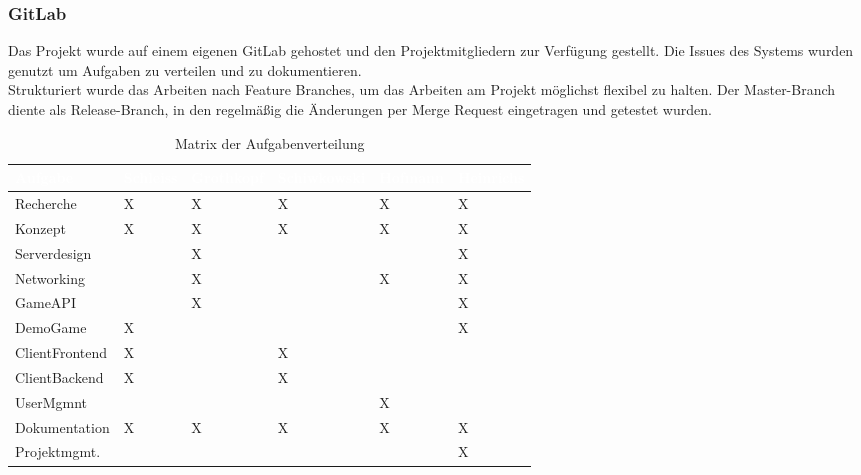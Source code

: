 \documentclass[a4paper]{spie}  %
\begin{document}
\subsubsection{GitLab}
Das Projekt wurde auf einem eigenen GitLab gehostet und den Projektmitgliedern zur Verfügung gestellt. Die Issues des Systems wurden genutzt um Aufgaben zu verteilen und zu dokumentieren.
\\
Strukturiert wurde das Arbeiten nach Feature Branches, um das Arbeiten am Projekt möglichst flexibel zu halten. Der Master-Branch diente als Release-Branch, in den regelmäßig die Änderungen per Merge Request eingetragen und getestet wurden.
\begin{table}
	\label{table:Aufgabenverteilung}
	\centering
		\caption{Matrix der Aufgabenverteilung}
		\begin{tabular}{| L{2.6cm} | C{2cm} | C{2cm} | C{2cm} | C{2cm} | C{2cm} |}
		\hline
		\textcolor{white}{\textbf{Aufgabe}} & \textcolor{white}{\textbf{Schleiss}} & \textcolor{white}{\textbf{Grothkopf}} & \textcolor{white}{\textbf{Schiwkowski}} & \textcolor{white}{\textbf{Hofmann}} & \textcolor{white}{\textbf{Heinrichs}}\\\hline
		Recherche 		& X & X	& X	& X	& X	\\\hline
		Konzept 		& X & X	& X	& X	& X	\\\hline
		Serverdesign	& 	& X & 	& 	& X \\\hline
		Networking		& 	& X	& 	& X	& X	\\\hline
		GameAPI 		& 	& X	&	&	& X	\\\hline
		DemoGame 		& X	&	&	&	& X	\\\hline
		ClientFrontend 	& X	&	& X	&	&	\\\hline
		ClientBackend 	& X	&	& X	&	&	\\\hline
		UserMgmnt 		& 	&	&	& X	& 	\\\hline
		Dokumentation   & X	& X & X	& X	& X \\\hline
		Projektmgmt. 	&	&	&	& 	& X	\\\hline
	\end{tabular}
\end{table}
\end{document}
